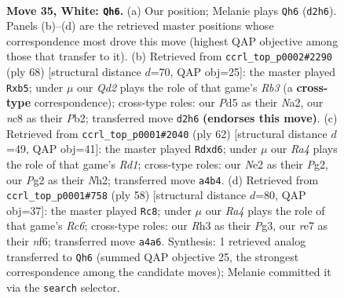 \documentclass[11pt]{article}
\begin{document}
\clearpage

\begin{figure}[p]\centering
\begin{subfigure}{0.46\textwidth}\centering
\resizebox{\linewidth}{!}{%
\newchessgame
\chessboard[
  setfen={1rn5/4rk2/p2p2p1/3P3p/Rpq1p2P/7R/3QNPP1/5K2 w - - 1 35},
  showmover=false,
  pgfstyle=straightmove, color=movearrow, markmove={d2-h6}
]}
\caption{}
\end{subfigure}\hfill
\begin{subfigure}{0.46\textwidth}\centering
\resizebox{\linewidth}{!}{%
\newchessgame
\chessboard[
  setfen={5r2/4qk2/Q2p1pr1/1ppPp2p/4P1nP/1R6/NP4P1/1K3R2 w - - 2 35},
  showmover=false,
  pgfstyle=straightmove, color=movearrow, markmove={b3-b5}
]}
\caption{}
\end{subfigure}
\\[4pt]
\begin{subfigure}{0.46\textwidth}\centering
\resizebox{\linewidth}{!}{%
\newchessgame
\chessboard[
  setfen={5r2/1p1rq1kp/1R1p2p1/P7/4pn2/Q6P/5PPN/3R2K1 w - - 2 32},
  showmover=false,
  pgfstyle=straightmove, color=movearrow, markmove={d1-d6}
]}
\caption{}
\end{subfigure}\hfill
\begin{subfigure}{0.46\textwidth}\centering
\resizebox{\linewidth}{!}{%
\newchessgame
\chessboard[
  setfen={8/p2r3k/2Rpqn2/4pp1p/7P/P4PP1/1P1QN3/K7 w - - 3 30},
  showmover=false,
  pgfstyle=straightmove, color=movearrow, markmove={c6-c8}
]}
\caption{}
\end{subfigure}
\caption{\textbf{Move 35, White: \texttt{Qh6}.} (a) Our position; Melanie plays \texttt{Qh6} (\texttt{d2h6}). Panels (b)--(d) are the retrieved master positions whose correspondence most drove this move (highest QAP objective among those that transfer to it). (b) Retrieved from \texttt{ccrl\_top\_p0002\#2290} (ply 68) [structural distance $d$=70, QAP obj=25]: the master played \texttt{Rxb5}; under $\mu$ our \emph{Qd2} plays the role of that game's \emph{Rb3} (a \textbf{cross-type} correspondence); cross-type roles: our \emph{P}d5 as their \emph{N}a2, our \emph{n}c8 as their \emph{P}b2; transferred move \texttt{d2h6} \textbf{(endorses this move)}. (c) Retrieved from \texttt{ccrl\_top\_p0001\#2040} (ply 62) [structural distance $d$=49, QAP obj=41]: the master played \texttt{Rdxd6}; under $\mu$ our \emph{Ra4} plays the role of that game's \emph{Rd1}; cross-type roles: our \emph{N}e2 as their \emph{P}g2, our \emph{P}g2 as their \emph{N}h2; transferred move \texttt{a4b4}. (d) Retrieved from \texttt{ccrl\_top\_p0001\#758} (ply 58) [structural distance $d$=80, QAP obj=37]: the master played \texttt{Rc8}; under $\mu$ our \emph{Ra4} plays the role of that game's \emph{Rc6}; cross-type roles: our \emph{R}h3 as their \emph{P}g3, our \emph{r}e7 as their \emph{n}f6; transferred move \texttt{a4a6}. Synthesis: 1 retrieved analog transferred to \texttt{Qh6} (summed QAP objective 25, the strongest correspondence among the candidate moves); Melanie committed it via the \texttt{search} selector.}
\label{fig:thought-m68}
\end{figure}
\end{document}
